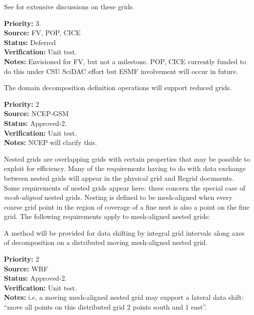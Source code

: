 
See \cite{art:heikes+:geodesic,art:majewski+:gme} for extensive
discussions on these grids.

\begin{reqlist}
{\bf Priority:} 3. \\ 
{\bf Source:} FV, POP, CICE \\
{\bf Status:} Deferred \\
{\bf Verification:} Unit test. \\
{\bf Notes:} Envisioned for FV, but not a milestone.  POP, CICE
             currently funded to do this under CSU SciDAC effort
             but ESMF involvement will occur in future.
\end{reqlist}


The domain decomposition definition operations will support reduced
grids.

\begin{reqlist}
{\bf Priority:} 2 \\
{\bf Source:} NCEP-GSM \\
{\bf Status:} Approved-2. \\
{\bf Verification:} Unit test. \\
{\bf Notes:} NCEP will clarify this.
\end{reqlist}


Nested grids are overlapping grids with certain properties that may be
possible to exploit for efficiency. Many of the requirements having to
do with data exchange between nested grids will appear in the physical grid
and Regrid documents. Some requirements of nested grids appear here:
these concern the special case of \emph{mesh-aligned} nested
grids. Nesting is defined to be mesh-aligned when every coarse grid
point in the region of coverage of a fine nest is also a point on the
fine grid. The following requirements apply to mesh-aligned nested
grids:


A method will be provided for data shifting by integral grid intervals
along axes of decomposition on a distributed moving mesh-aligned
nested grid.

\begin{reqlist}
{\bf Priority:} 2 \\
{\bf Source:} WRF \\
{\bf Status:} Approved-2. \\
{\bf Verification:} Unit test. \\
{\bf Notes:} i.e, a moving mesh-aligned nested grid may support a
  lateral data shift: ``move all points on this distributed grid 2
  points south and 1 east''.
\end{reqlist}

